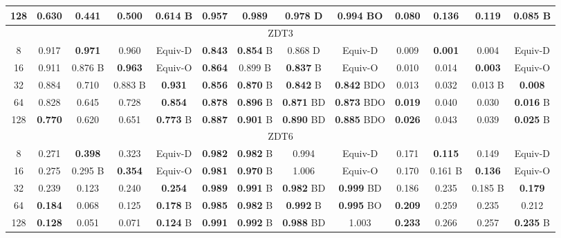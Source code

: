 \documentclass[preprint]{elsarticle}
\begin{document}
\begin{table}
{\begin{tabular}{|c||c|c|c|c||c|c|c|c||c|c|c|c||}
128	& \textbf{	0.630	}	&	0.441		&	0.500			& \textbf{	0.614	}	B	& \textbf{	0.957	}	&	0.989			&	0.978		D	& \textbf{	0.994	}	BO	& \textbf{	0.080	}	&	0.136		&	0.119		& \textbf{	0.085	}	B			\\ \hline
\multicolumn{13}{|c|}{ZDT3}																																													\\ \hline
8	&	0.917		& \textbf{	0.971	}	&	0.960			&	Equiv-D			& \textbf{	0.843	}	& \textbf{	0.854	}	B	&	0.868		D	&	Equiv-D			&	0.009		& \textbf{	0.001	}	&	0.004		&	Equiv-D					\\
16	&	0.911		&	0.876	B	& \textbf{	0.963	}		&	Equiv-O			& \textbf{	0.864	}	&	0.899		B	& \textbf{	0.837	}	B	&	Equiv-O			&	0.010		&	0.014		& \textbf{	0.003	}	&	Equiv-O					\\
32	&	0.884		&	0.710		&	0.883		B	& \textbf{	0.931	}		& \textbf{	0.856	}	& \textbf{	0.870	}	B	& \textbf{	0.842	}	B	& \textbf{	0.842	}	BDO	&	0.013		&	0.032		&	0.013	B	& \textbf{	0.008	}				\\
64	&	0.828		&	0.645		&	0.728			& \textbf{	0.854	}		& \textbf{	0.878	}	& \textbf{	0.896	}	B	& \textbf{	0.871	}	BD	& \textbf{	0.873	}	BDO	& \textbf{	0.019	}	&	0.040		&	0.030		& \textbf{	0.016	}	B			\\
128	& \textbf{	0.770	}	&	0.620		&	0.651			& \textbf{	0.773	}	B	& \textbf{	0.887	}	& \textbf{	0.901	}	B	& \textbf{	0.890	}	BD	& \textbf{	0.885	}	BDO	& \textbf{	0.026	}	&	0.043		&	0.039		& \textbf{	0.025	}	B			\\ \hline
\multicolumn{13}{|c|}{ZDT6}																																													\\ \hline
8	&	0.271		& \textbf{	0.398	}	&	0.323			&	Equiv-D			& \textbf{	0.982	}	& \textbf{	0.982	}	B	&	0.994			&	Equiv-D			&	0.171		& \textbf{	0.115	}	&	0.149		&	Equiv-D					\\
16	&	0.275		&	0.295	B	& \textbf{	0.354	}		&	Equiv-O			& \textbf{	0.981	}	& \textbf{	0.970	}	B	&	1.006			&	Equiv-O			&	0.170		&	0.161	B	& \textbf{	0.136	}	&	Equiv-O					\\
32	&	0.239		&	0.123		&	0.240			& \textbf{	0.254	}		& \textbf{	0.989	}	& \textbf{	0.991	}	B	& \textbf{	0.982	}	BD	& \textbf{	0.999	}	BD	&	0.186		&	0.235		&	0.185	B	& \textbf{	0.179	}				\\
64	& \textbf{	0.184	}	&	0.068		&	0.125			& \textbf{	0.178	}	B	& \textbf{	0.985	}	& \textbf{	0.982	}	B	& \textbf{	0.992	}	B	& \textbf{	0.995	}	BO	& \textbf{	0.209	}	&	0.259		&	0.235		&	0.212					\\
128	& \textbf{	0.128	}	&	0.051		&	0.071			& \textbf{	0.124	}	B	& \textbf{	0.991	}	& \textbf{	0.992	}	B	& \textbf{	0.988	}	BD	&	1.003			& \textbf{	0.233	}	&	0.266		&	0.257		& \textbf{	0.235	}	B			\\ \hline


\end{tabular}}
\end{table}
\end{document}
